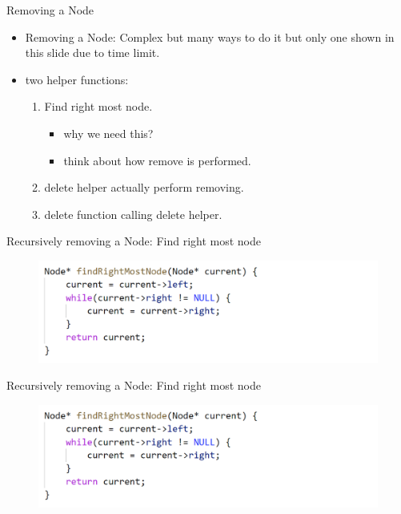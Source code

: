 \documentclass{beamer}
\begin{document}
\begin{frame}{Removing a Node}
    \begin{itemize}
        \item Removing a Node: Complex but many ways to do it but only one shown in this slide due to time limit.
        \item two helper functions:
            \begin{enumerate}
                \item Find right most node. 
                    \begin{itemize}
                        \item why we need this?
                        \item think about how remove is performed.
                    \end{itemize}
                \item delete helper actually perform removing.
                \item delete function calling delete helper.
            \end{enumerate}
    \end{itemize}
\end{frame}

\begin{frame}{Recursively removing a Node:  Find right most node}
        \begin{figure}
            \includegraphics[width=\textwidth]{BST_FRM.png}
    \end{figure}
\end{frame}

\begin{frame}{Recursively removing a Node:  Find right most node}
        \begin{figure}
            \includegraphics[width=\textwidth]{BST_FRM.png}
    \end{figure}
\end{frame}
\end{document}

